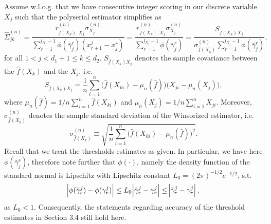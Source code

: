 Assume w.l.o.g. that we have consecutive integer scoring in our discrete variable $X_j$ such that the polyserial estimator simplifies as
\begin{equation}
    \hat{\Sigma}_{jk}^{(n)} = \frac{r^{(n)}_{\hat{f}(X_k),X_j} \sigma^{(n)}_{X_j}}{\sum_{r=1}^{l_{X_j}-1} \phi(\bar{\gamma}_j^r)(x^j_{r+1} - x_j^r)} = \frac{r^{(n)}_{\hat{f}(X_k),X_j} \sigma^{(n)}_{X_j}}{\sum_{r=1}^{l_{X_j}-1} \phi(\bar{\gamma}_j^r)} = \frac{S_{\hat{f}(X_k)X_j}}{\sigma^{(n)}_{\hat{f}(X_k)}\sum_{r=1}^{l_{X_j}-1} \phi(\bar{\gamma}_j^r)},
\end{equation}
for all $1 < j < d_1+1 \leq k \leq d_2$. $S_{\hat{f}(X_k)X_j}$ denotes the sample covariance between the $\hat{f}(X_k)$ and the $X_j$, i.e.
\begin{equation*}
    S_{\hat{f}(X_k)X_j} = \frac{1}{n}\sum_{i=1}^n \Big(\hat{f}(X_{ki}) - \mu_n(\hat{f})\Big)\Big(X_{ji} - \mu_n(X_j)\Big),
\end{equation*}
where $\mu_n(\hat{f}) = 1/n\sum_{i=1}^n\hat f(X_{ki})$ and $\mu_n(X_j) = 1/n\sum_{i=1}^n X_{ji}$. Moreover, $\sigma^{(n)}_{\hat{f}(X_k)}$ denotes the sample standard deviation of the Winsorized estimator, i.e.
\begin{equation*}
    \sigma^{(n)}_{\hat{f}(X_k)} \equiv \sqrt{\frac{1}{n}\sum_{i=1}^n \Big(\hat{f}(X_{ki}) - \mu_n(\hat{f})\Big)^2}.
\end{equation*}
Recall that we treat the thresholds estimates as given. In particular, we have here $\phi(\bar{\gamma}_j^r)$, therefore note further that $\phi(\cdot)$, namely the density function of the standard normal is Lipschitz with Lipschitz constant $L_0 = (2\pi)^{-1/2}e^{-1/2}$, s.t.
\begin{equation*}
    \abs{\phi(\bar{\gamma}_r^j) - \phi(\gamma_r^j)} \leq L_0 \abs{\bar{\gamma}_r^j - \gamma_r^j} \leq \abs{\bar{\gamma}_r^j - \gamma_r^j},
\end{equation*}
as $L_0 < 1$. Consequently, the statements regarding accuracy of the threshold estimates in Section 3.4 %
still hold here. 

